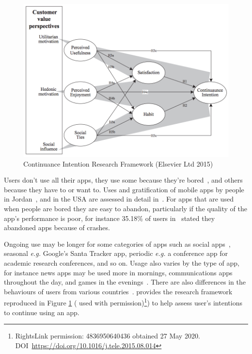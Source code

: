 \begin{figure}[ht]
    \centering
    \includegraphics[width=13cm]{images/Consumer_Value_Perspectives_screenshot.png}
    \caption{Continuance Intention Research Framework (\textcopyright Elsevier Ltd 2015)}
    \label{fig:consumer_value_perspectives_elsevier}
\end{figure}

Users don't use all their apps, they use some because they're bored~\cite{pielot2015attention}, and others because they have to or want to. Uses and gratification of mobile apps by people in Jordan~\cite{ALNAWAS2016313}, and in the USA are assessed in detail in~\cite{gerlich2015app}. For apps that are used when people are bored they are easy to abandon, particularly if the quality of the app's performance is poor, for instance 35.18\% of users in~\cite{lim_investigating_country_differences} stated they abandoned apps because of crashes. 

Ongoing use may be longer for some categories of apps such as social apps~\cite{HSIAO2016342}, seasonal \emph{e.g.} Google's Santa Tracker app, periodic \emph{e.g.} a conference app for academic research conferences, and so on. Usage also varies by the type of app, for instance news apps may be used more in mornings, communications apps throughout the day, and games in the evenings~\cite{bohmer2011falling_asleep_with_angry_birds}. There are also differences in the behaviours of users from various countries~\cite{lim_investigating_country_differences}.  
\cite{HSIAO2016342} provides the research framework reproduced in Figure \ref{fig:consumer_value_perspectives_elsevier} ( used with permission)\footnote{RightsLink permission: 4836950640436 obtained 27 May 2020. DOI~\url{https://doi.org/10.1016/j.tele.2015.08.014}}) to help assess user's intentions to continue using an app.

